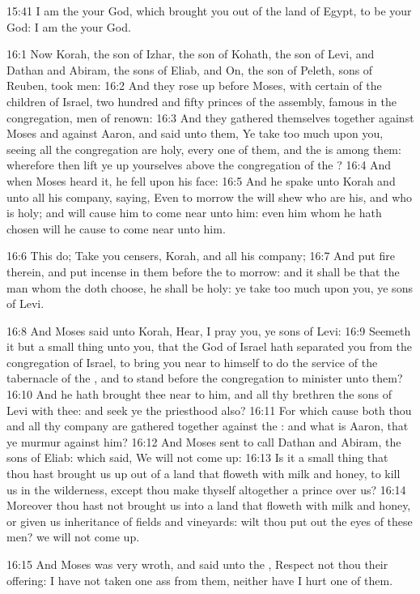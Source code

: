 15:41 I am the \LORD your God, which brought you out of the land of
Egypt, to be your God: I am the \LORD your God.

16:1 Now Korah, the son of Izhar, the son of Kohath, the son of Levi,
and Dathan and Abiram, the sons of Eliab, and On, the son of Peleth,
sons of Reuben, took men: 16:2 And they rose up before Moses, with
certain of the children of Israel, two hundred and fifty princes of
the assembly, famous in the congregation, men of renown: 16:3 And they
gathered themselves together against Moses and against Aaron, and said
unto them, Ye take too much upon you, seeing all the congregation are
holy, every one of them, and the \LORD is among them: wherefore then
lift ye up yourselves above the congregation of the \LORD?  16:4 And
when Moses heard it, he fell upon his face: 16:5 And he spake unto
Korah and unto all his company, saying, Even to morrow the \LORD will
shew who are his, and who is holy; and will cause him to come near
unto him: even him whom he hath chosen will he cause to come near unto
him.

16:6 This do; Take you censers, Korah, and all his company; 16:7 And
put fire therein, and put incense in them before the \LORD to morrow:
and it shall be that the man whom the \LORD doth choose, he shall be
holy: ye take too much upon you, ye sons of Levi.

16:8 And Moses said unto Korah, Hear, I pray you, ye sons of Levi:
16:9 Seemeth it but a small thing unto you, that the God of Israel
hath separated you from the congregation of Israel, to bring you near
to himself to do the service of the tabernacle of the \LORD, and to
stand before the congregation to minister unto them?  16:10 And he
hath brought thee near to him, and all thy brethren the sons of Levi
with thee: and seek ye the priesthood also?  16:11 For which cause
both thou and all thy company are gathered together against the \LORD:
and what is Aaron, that ye murmur against him?  16:12 And Moses sent
to call Dathan and Abiram, the sons of Eliab: which said, We will not
come up: 16:13 Is it a small thing that thou hast brought us up out of
a land that floweth with milk and honey, to kill us in the wilderness,
except thou make thyself altogether a prince over us?  16:14 Moreover
thou hast not brought us into a land that floweth with milk and honey,
or given us inheritance of fields and vineyards: wilt thou put out the
eyes of these men? we will not come up.

16:15 And Moses was very wroth, and said unto the \LORD, Respect not
thou their offering: I have not taken one ass from them, neither have
I hurt one of them.

